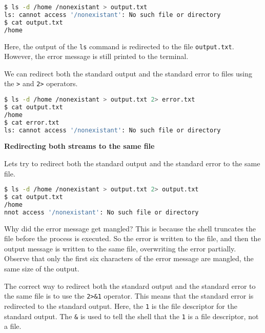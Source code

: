 \begin{lstlisting}[language=bash]
$ ls -d /home /nonexistant > output.txt
ls: cannot access '/nonexistant': No such file or directory
$ cat output.txt
/home
\end{lstlisting}

Here, the output of the \texttt{ls} command is redirected to the file
\texttt{output.txt}. However, the error message is still printed to
the terminal.

We can redirect both the standard output and the standard error to
files using the \texttt{>} and \texttt{2>} operators.

\begin{lstlisting}[language=bash]
$ ls -d /home /nonexistant > output.txt 2> error.txt
$ cat output.txt
/home
$ cat error.txt
ls: cannot access '/nonexistant': No such file or directory
\end{lstlisting}

\textbf{Redirecting both streams to the same file}

Lets try to redirect both the standard output and the standard error
to the same file.

\begin{lstlisting}[language=bash]
$ ls -d /home /nonexistant > output.txt 2> output.txt
$ cat output.txt
/home
nnot access '/nonexistant': No such file or directory
\end{lstlisting}

Why did the error message get mangled? This is because the shell
truncates the file before the process is executed. So the error
is written to the file, and then the output message is written to
the same file, overwriting the error partially.
Observe that only the first six characters of the
error message are mangled, the same size of the output.

The correct way to redirect both the standard output and the standard
error to the same file is to use the \texttt{2>\&1} operator.
This means that the standard error is redirected to the standard output.
Here, the \texttt{1} is the file descriptor for the standard output.
The \texttt{\&} is used to tell the shell that the \texttt{1} is a file
descriptor, not a file.

